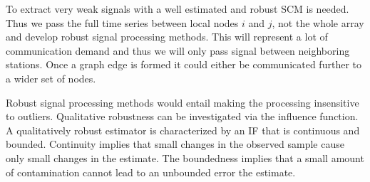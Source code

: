 To extract very weak signals with a well estimated and robust SCM is needed. Thus we  pass the full time series between local nodes $i$ and $j$, not the whole array and develop robust signal processing methods\cite{zoubir2018}. This will represent a lot of communication demand and thus we will only pass signal between neighboring stations. Once a graph edge is formed it could either be communicated further to a wider set of nodes.

Robust signal processing methods\cite{zoubir2018} would entail making the processing insensitive to outliers. Qualitative robustness can be investigated via the influence function. A qualitatively robust estimator is characterized by an IF that is continuous and bounded. Continuity implies that small changes in the observed sample cause only small changes in the estimate. The boundedness implies that a small amount of contamination cannot lead to an unbounded error the estimate.
